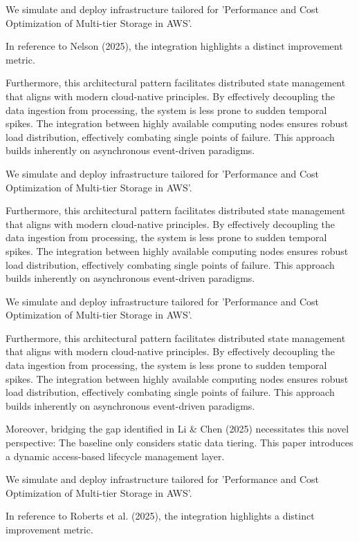 We simulate and deploy infrastructure tailored for 'Performance and Cost Optimization of Multi-tier Storage in AWS'.

In reference to Nelson (2025), the integration highlights a distinct improvement metric.


Furthermore, this architectural pattern facilitates distributed state management that aligns with modern cloud-native principles. 
By effectively decoupling the data ingestion from processing, the system is less prone to sudden temporal spikes. 
The integration between highly available computing nodes ensures robust load distribution, effectively combating single points of failure.
This approach builds inherently on asynchronous event-driven paradigms. 


We simulate and deploy infrastructure tailored for 'Performance and Cost Optimization of Multi-tier Storage in AWS'.


Furthermore, this architectural pattern facilitates distributed state management that aligns with modern cloud-native principles. 
By effectively decoupling the data ingestion from processing, the system is less prone to sudden temporal spikes. 
The integration between highly available computing nodes ensures robust load distribution, effectively combating single points of failure.
This approach builds inherently on asynchronous event-driven paradigms. 


We simulate and deploy infrastructure tailored for 'Performance and Cost Optimization of Multi-tier Storage in AWS'.


Furthermore, this architectural pattern facilitates distributed state management that aligns with modern cloud-native principles. 
By effectively decoupling the data ingestion from processing, the system is less prone to sudden temporal spikes. 
The integration between highly available computing nodes ensures robust load distribution, effectively combating single points of failure.
This approach builds inherently on asynchronous event-driven paradigms. 


Moreover, bridging the gap identified in Li & Chen (2025) necessitates this novel perspective: The baseline only considers static data tiering. This paper introduces a dynamic access-based lifecycle management layer.

We simulate and deploy infrastructure tailored for 'Performance and Cost Optimization of Multi-tier Storage in AWS'.

In reference to Roberts et al. (2025), the integration highlights a distinct improvement metric.


